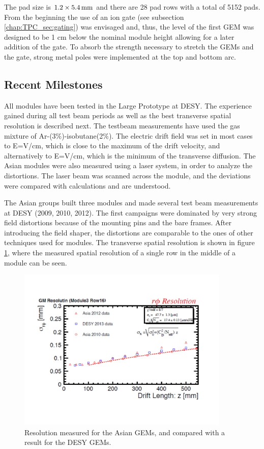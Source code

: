 The pad size is $1.2 \times \unit[5.4]{mm}$ and there are 28 pad rows with a total of 5152 pads.
From the beginning the use of an ion gate
(see subsection \ref{chap:TPC_sec:gating}) was envisaged and, thus, the level of the first GEM was designed
to be 1 cm below the nominal module height allowing for a later addition of the gate. To absorb the strength necessary
to stretch the GEMs and the gate, strong metal poles were implemented at the top and bottom arc.

\subsection{Recent Milestones}

All modules have been tested in the Large Prototype at DESY. The experience gained during all test beam periods as
well as the best transverse spatial resolution is described next. The testbeam measurements have used
the gas mixture of Ar-(3\%)-isobutane(2\%). The electric drift field was set in most cases to
E=\unit[230]{V/cm}, which is close to the maximum of the drift velocity, and alternatively to
E=\unit[130]{V/cm}, which is the minimum of the transverse diffusion.
The Asian modules were also measured using a laser system, in order to analyze the distortions.
The laser beam was scanned across the module, and the deviations were compared with calculations and are understood.

The Asian groups built three modules and made several test beam measurements at DESY (2009, 2010, 2012).
The first campaigns were dominated by very strong field distortions because of the mounting pins and the bare frames.
After introducing the field shaper, the distortions are comparable to the ones of other techniques used for modules.
The transverse spatial resolution is shown in figure \ref{fig_Fig2asiangemresolution}, where the measured spatial
resolution of a single row in the middle of a module can be seen.

\begin{figure}[!htb]
  \centering
  \includegraphics[width=0.9\textwidth]{Tracker/TPC_Bonn/plots/TPC-AG_Fig2asiangemresolution.pdf}
  \caption{Resolution measured for the Asian GEMs, and compared with a result for the DESY GEMs.}
  \label{fig_Fig2asiangemresolution}
\end{figure}

